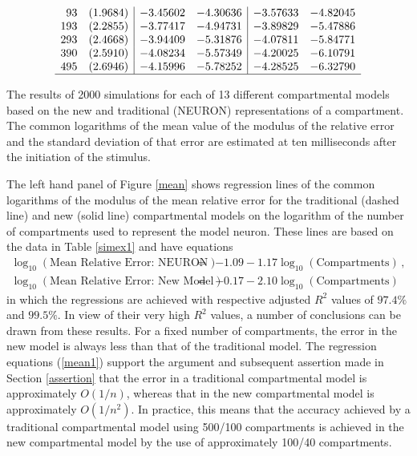 \begin{table}[!h]
\[\begin{array}{c|cc|cc}
\phantom{0}93 \quad (1.9684) & -3.45602 & -4.30636 & -3.57633 & -4.82045 \\
          193 \quad (2.2855) & -3.77417 & -4.94731 & -3.89829 & -5.47886 \\
          293 \quad (2.4668) & -3.94409 & -5.31876 & -4.07811 & -5.84771 \\
          390 \quad (2.5910) & -4.08234 & -5.57349 & -4.20025 & -6.10791 \\
          495 \quad (2.6946) & -4.15996 & -5.78252 & -4.28525 & -6.32790 \\
\hline
\end{array}
\]
\centering
\parbox{5in}{\caption{\label{simex1} The results of 2000 simulations
for each of 13 different compartmental models based on the new and
traditional (NEURON) representations of a compartment. The common
logarithms of the mean value of the modulus of the relative error
and the standard deviation of that error are estimated at ten
milliseconds after the initiation of the stimulus.}}
\end{table}

The left hand panel of Figure \ref{mean} shows regression lines of
the common logarithms of the modulus of the mean relative error
for the traditional (dashed line) and new (solid line)
compartmental models on the logarithm of the number of
compartments used to represent the model neuron. These lines are
based on the data in Table \ref{simex1} and have equations
\begin{equation}\label{mean1}
\begin{array}{rcl}
\log_{10}(\mbox{Mean Relative Error: NEURON}) & = &
-1.09-1.17\log_{10}(\mbox{Compartments})\,, \\[5pt]
\log_{10}(\mbox{Mean Relative Error: New Model}) & = &
-0.17-2.10\log_{10}(\mbox{Compartments})
\end{array}
\end{equation}
in which the regressions are achieved with respective adjusted
$R^2$ values of $97.4\%$ and $99.5\%$. In view of their very high
$R^2$ values, a number of conclusions can be drawn from these
results. For a fixed number of compartments, the error in the new
model is always less than that of the traditional model. The
regression equations (\ref{mean1}) support the argument and
subsequent assertion made in Section \ref{assertion} that the
error in a traditional compartmental model is approximately
$O(1/n)$, whereas that in the new compartmental model is
approximately $O(1/n^2)$. In practice, this means that the
accuracy achieved by a traditional compartmental model using
500/100 compartments is achieved in the new compartmental model by
the use of approximately 100/40 compartments.

